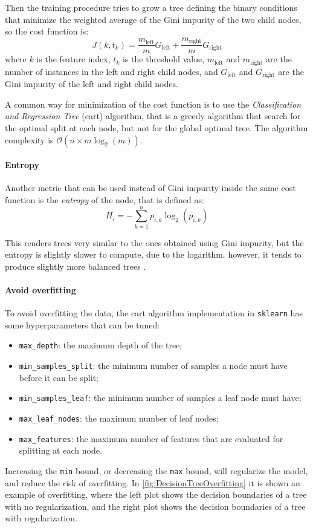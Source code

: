 Then the training procedure tries to grow a tree defining the binary conditions that minimize the weighted average of the Gini impurity of the two child nodes, so the cost function is:
\begin{equation}
    J(k, t_k) = \frac{m_{\text{left}}}{m}G_{\text{left}} + \frac{m_{\text{right}}}{m}G_{\text{right}}
\end{equation}
where $k$ is the feature index, $t_k$ is the threshold value, $m_{\text{left}}$ and $m_{\text{right}}$ are the number of instances in the left and right child nodes, and $G_{\text{left}}$ and $G_{\text{right}}$ are the Gini impurity of the left and right child nodes.

A common way for minimization of the cost function is to use the \emph{Classification and Regression Tree} (\gls{cart}) algorithm, that is a greedy algorithm that search for the optimal split at each node, but not for the global optimal tree. The algorithm complexity is $\mathcal{O}(n \times m \log_2(m))$.

\paragraph{Entropy}
Another metric that can be used instead of Gini impurity inside the same cost function is the \emph{entropy} of the node, that is defined as:
\begin{equation}
    H_i = - \sum_{k=1}^{n}p_{i,k}\log_2(p_{i,k})
\end{equation}

This renders trees very similar to the ones obtained using Gini impurity, but the entropy is slightly slower to compute, due to the logarithm. however, it tends to produce slightly more balanced trees \cite{raschka2013decisiontrees}.

\paragraph{Avoid overfitting}
To avoid overfitting the data, the \gls{cart} algorithm implementation in \texttt{sklearn} has some hyperparameters that can be tuned:
\begin{itemize}
    \item \texttt{max\_depth}: the maximum depth of the tree;
    \item \texttt{min\_samples\_split}: the minimum number of samples a node must have before it can be split;
    \item \texttt{min\_samples\_leaf}: the minimum number of samples a leaf node must have;
    \item \texttt{max\_leaf\_nodes}: the maximum number of leaf nodes;
    \item \texttt{max\_features}: the maximum number of features that are evaluated for splitting at each node.
\end{itemize}
Increasing the \texttt{min} bound, or decreasing the \texttt{max} bound, will regularize the model, and reduce the risk of overfitting.
In \autoref{fig:DecisionTreeOverfitting} it is shown an example of overfitting, where the left plot shows the decision boundaries of a tree with no regularization, and the right plot shows the decision boundaries of a tree with regularization.

